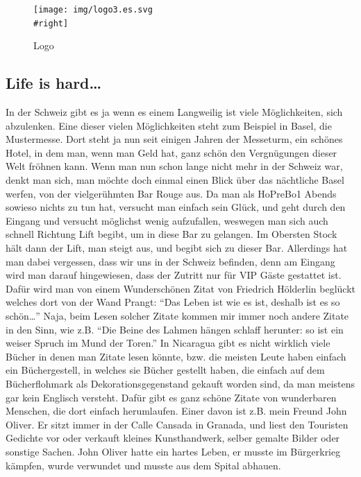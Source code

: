 \documentclass[
]{article}
\begin{document}
\begin{figure}
\centering
\texttt{[image: img/logo3.es.svg\\\#right]}
\caption{Logo}
\end{figure}

\hypertarget{life-is-hard}{%
\subsection{Life is hard\ldots{}}\label{life-is-hard}}

In der Schweiz gibt es ja wenn es einem Langweilig ist viele
Möglichkeiten, sich abzulenken. Eine dieser vielen Möglichkeiten steht
zum Beispiel in Basel, die Mustermesse. Dort steht ja nun seit einigen
Jahren der Messeturm, ein schönes Hotel, in dem man, wenn man Geld hat,
ganz schön den Vergnügungen dieser Welt fröhnen kann. Wenn man nun schon
lange nicht mehr in der Schweiz war, denkt man sich, man möchte doch
einmal einen Blick über das nächtliche Basel werfen, von der
vielgerühmten Bar Rouge aus. Da man als HoPreBo1 Abends sowieso nichts
zu tun hat, versucht man einfach sein Glück, und geht durch den Eingang
und versucht möglichst wenig aufzufallen, weswegen man sich auch schnell
Richtung Lift begibt, um in diese Bar zu gelangen. Im Obersten Stock
hält dann der Lift, man steigt aus, und begibt sich zu dieser Bar.
Allerdings hat man dabei vergessen, dass wir uns in der Schweiz
befinden, denn am Eingang wird man darauf hingewiesen, dass der Zutritt
nur für VIP Gäste gestattet ist. Dafür wird man von einem Wunderschönen
Zitat von Friedrich Hölderlin beglückt welches dort von der Wand Prangt:
``Das Leben ist wie es ist, deshalb ist es so schön\ldots{}'' Naja, beim
Lesen solcher Zitate kommen mir immer noch andere Zitate in den Sinn,
wie z.B. ``Die Beine des Lahmen hängen schlaff herunter: so ist ein
weiser Spruch im Mund der Toren.'' In Nicaragua gibt es nicht wirklich
viele Bücher in denen man Zitate lesen könnte, bzw. die meisten Leute
haben einfach ein Büchergestell, in welches sie Bücher gestellt haben,
die einfach auf dem Bücherflohmark als Dekorationsgegenstand gekauft
worden sind, da man meistens gar kein Englisch versteht. Dafür gibt es
ganz schöne Zitate von wunderbaren Menschen, die dort einfach
herumlaufen. Einer davon ist z.B. mein Freund John Oliver. Er sitzt
immer in der Calle Cansada in Granada, und liest den Touristen Gedichte
vor oder verkauft kleines Kunsthandwerk, selber gemalte Bilder oder
sonstige Sachen. John Oliver hatte ein hartes Leben, er musste im
Bürgerkrieg kämpfen, wurde verwundet und musste aus dem Spital abhauen.
\end{document}

